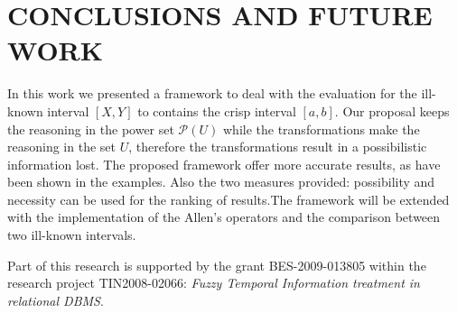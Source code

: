 \documentclass[twoside,twocolumn,a4paper]{article}
\newcommand{\Pow}{\mathcal{P}}
\begin{document}
\section{\label{sec:conclusions}CONCLUSIONS AND FUTURE WORK}
In this work we presented a framework to deal with the evaluation for the ill-known interval $[X,Y]$ to contains the crisp interval $[a,b]$. Our proposal keeps the reasoning in the power set $\Pow(U)$ while the transformations make the reasoning in the set $U$, therefore the transformations result in a possibilistic information lost. The proposed framework offer more accurate results, as have been shown in the examples. Also the two measures provided: possibility and necessity can be used for the ranking of results.The framework will be extended with the implementation of the Allen's operators and the comparison between two ill-known intervals.
%
%
%
%
%
%


\begin{ack}
Part of this research is supported by the grant BES-2009-013805 within the research project TIN2008-02066: \emph{Fuzzy Temporal Information treatment in relational DBMS}.
\end{ack}



\end{document}
